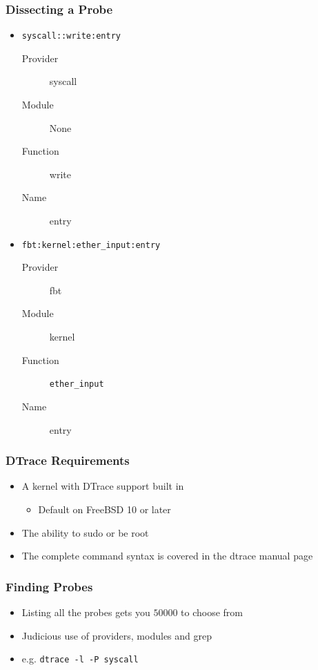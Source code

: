 \documentclass[pdftex]{beamer} %
\begin{document}
\begin{frame}[fragile]
  \frametitle{Dissecting a Probe}
  \begin{itemize}
  \item \Verb+syscall::write:entry+
    \begin{description}
    \item[Provider] syscall
    \item[Module] None
    \item[Function] write
    \item[Name] entry
    \end{description}
  \item \Verb+fbt:kernel:ether_input:entry+
    \begin{description}
    \item[Provider] fbt
    \item[Module] kernel
    \item[Function] \Verb+ether_input+
    \item[Name] entry
    \end{description}
  \end{itemize}
\end{frame}

\begin{frame}
  \frametitle{DTrace Requirements}
  \begin{itemize}
  \item A kernel with DTrace support built in
    \begin{itemize}
    \item Default on FreeBSD 10 or later
    \end{itemize}
  \item The ability to sudo or be root
  \item The complete command syntax is covered in the dtrace manual page
  \end{itemize}
\end{frame}

\begin{frame}[fragile]
  \frametitle{Finding Probes}
  \begin{itemize}
  \item Listing all the probes gets you $50000$ to choose from
  \item Judicious use of providers, modules and grep 
  \item e.g. \Verb+dtrace -l -P syscall+
  \end{itemize}
\end{frame}
\end{document}

